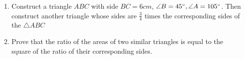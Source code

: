 \begin{enumerate}
\item Construct a triangle $ABC$ with side $BC = 6 cm$, $\angle B=45\degree, \angle A= 105\degree$. Then construct another triangle whose sides are $\frac{3}{4}$ times the corresponding sides of the $\triangle ABC$
\item Prove that the ratio of the areas of two similar triangles is equal to the square of the ratio of their corresponding sides. 
\end{enumerate}
